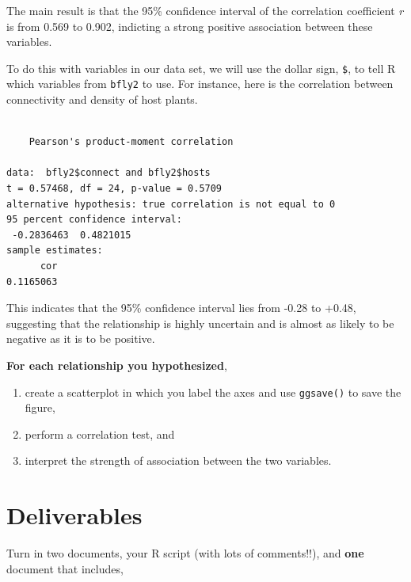 \documentclass[
  letterpaper,
  DIV=11,
  numbers=noendperiod]{scrreprt}
\newenvironment{Shaded}{\begin{snugshade}}{\end{snugshade}}
\newcommand{\FunctionTok}[1]{\textcolor[rgb]{0.28,0.35,0.67}{#1}}
\newcommand{\NormalTok}[1]{\textcolor[rgb]{0.00,0.23,0.31}{#1}}
\newcommand{\SpecialCharTok}[1]{\textcolor[rgb]{0.37,0.37,0.37}{#1}}
\providecommand{\tightlist}{%
  \setlength{\itemsep}{0pt}\setlength{\parskip}{0pt}}
\begin{document}
The main result is that the 95\% confidence interval of the correlation
coefficient \emph{r} is from 0.569 to 0.902, indicting a strong positive
association between these variables.

To do this with variables in our data set, we will use the dollar sign,
\texttt{\$}, to tell R which variables from \texttt{bfly2} to use. For
instance, here is the correlation between connectivity and density of
host plants.

\begin{Shaded}
\end{Shaded}

\begin{verbatim}

    Pearson's product-moment correlation

data:  bfly2$connect and bfly2$hosts
t = 0.57468, df = 24, p-value = 0.5709
alternative hypothesis: true correlation is not equal to 0
95 percent confidence interval:
 -0.2836463  0.4821015
sample estimates:
      cor 
0.1165063 
\end{verbatim}

This indicates that the 95\% confidence interval lies from -0.28 to
+0.48, suggesting that the relationship is highly uncertain and is
almost as likely to be negative as it is to be positive.

\textbf{For each relationship you hypothesized},

\begin{enumerate}
\def\labelenumi{\arabic{enumi}.}
\tightlist
\item
  create a scatterplot in which you label the axes and use
  \texttt{ggsave()} to save the figure,
\item
  perform a correlation test, and
\item
  interpret the strength of association between the two variables.
\end{enumerate}

\section{Deliverables}\label{deliverables-8}

Turn in two documents, your R script (with lots of comments!!), and
\textbf{one} document that includes,
\end{document}
